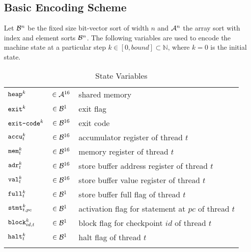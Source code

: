 
\subsection{Basic Encoding Scheme}

Let $\BVSORT[n]$ be the fixed size bit-vector sort of width $n$ and $\ASORT[n]$ the array sort with index and element sorts $\BVSORT[n]$.
The following variables are used to encode the machine state at a particular step $k \in [0, bound] \subset \mathbb{N}$, where $k = 0$ is the initial state.

\setlength{\tabulinesep}{3pt}
\begin{longtabu}{llX}
  \firsthline
  $\HEAP^k$ & $\in \ASORT$ & shared memory \\
  $\EXIT^k$ & $\in \BVSORT[1]$ & exit flag \\
  $\EXITCODE^k$ & $\in \BVSORT$ & exit code \\
  \hline
  $\ACCU^k_t$ & $\in \BVSORT$ & accumulator register of thread $t$ \\
  $\MEM^k_t$ & $\in \BVSORT$ &  memory register of thread $t$ \\
  $\SBADR^k_t$ & $\in \BVSORT$ & store buffer address register of thread $t$ \\
  $\SBVAL^k_t$ & $\in \BVSORT$ & store buffer value register of thread $t$ \\
  $\SBFULL^k_t$ & $\in \BVSORT[1]$ & store buffer full flag of thread $t$ \\
  $\STMT^k_{t, pc}$ & $\in \BVSORT[1]$ & activation flag for statement at $pc$ of thread $t$ \\
  $\BLOCK^k_{id, t}$ & $\in \BVSORT[1]$ & block flag for checkpoint $id$ of thread $t$ \\
  $\HALT^k_t$ & $\in \BVSORT[1]$ & halt flag of thread $t$ \\
  \lasthline
  \caption{State Variables}
  \label{tbl:states}
\end{longtabu}

\newcommand{\READ}{\texttt{read}}
\newcommand{\WRITE}{\texttt{write}}


